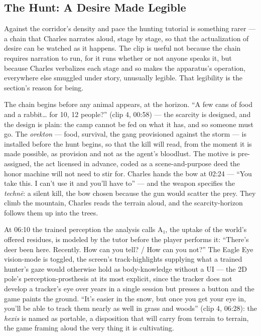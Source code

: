 \documentclass{article}
\begin{document}
\bigskip

\subsection*{The Hunt: A Desire Made Legible}

Against the corridor's density and pace the hunting tutorial is something rarer — a chain that Charles narrates aloud, stage by stage, so that the actualization of desire can be watched as it happens. The clip is useful not because the chain requires narration to run, for it runs whether or not anyone speaks it, but because Charles verbalizes each stage and so makes the apparatus's operation, everywhere else smuggled under story, unusually legible. That legibility is the section's reason for being.

The chain begins before any animal appears, at the horizon. ``A few cans of food and a rabbit… for 10, 12 people?'' (clip 4, 00:58) — the scarcity is designed, and the design is plain: the camp cannot be fed on what it has, and so someone must go. The \textit{orekton} — food, survival, the gang provisioned against the storm — is installed before the hunt begins, so that the kill will read, from the moment it is made possible, as provision and not as the agent's bloodlust. The motive is pre-assigned, the act licensed in advance, coded as a scene-and-purpose deed the honor machine will not need to stir for. Charles hands the bow at 02:24 — ``You take this. I can't use it and you'll have to'' — and the weapon specifies the \textit{technē}: a silent kill, the bow chosen because the gun would scatter the prey. They climb the mountain, Charles reads the terrain aloud, and the scarcity-horizon follows them up into the trees.

At 06:10 the trained perception the analysis calls A₁, the uptake of the world's offered residues, is modeled by the tutor before the player performs it: ``There's deer been here. Recently. How can you tell? / How can you not?'' The Eagle Eye vision-mode is toggled, the screen's track-highlights supplying what a trained hunter's gaze would otherwise hold as body-knowledge without a UI — the 2D pole's perception-prosthesis at its most explicit, since the tracker does not develop a tracker's eye over years in a single session but presses a button and the game paints the ground. ``It's easier in the snow, but once you get your eye in, you'll be able to track them nearly as well in grass and woods'' (clip 4, 06:28): the \textit{hexis} is named as portable, a disposition that will carry from terrain to terrain, the game framing aloud the very thing it is cultivating.
\end{document}
